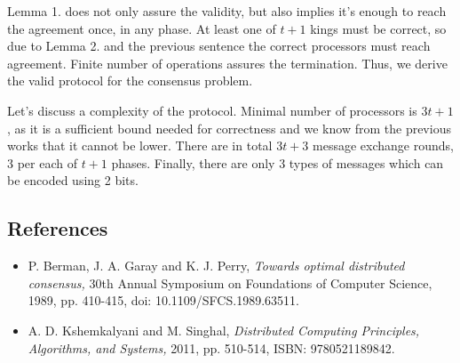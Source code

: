 \documentclass[11pt, a4paper]{report}
\begin{document}
Lemma 1. does not only assure the validity, but also implies it's enough to reach the agreement once, in any phase. At least one of $t+1$ kings must be correct, so due to Lemma 2. and the previous sentence the correct processors must reach agreement. Finite number of operations assures the termination. Thus, we derive the valid protocol for the consensus problem.

Let's discuss a complexity of the protocol. Minimal number of processors is $3t+1$, as it is a sufficient bound needed for correctness and we know from the previous works that it cannot be lower. There are in total $3t+3$ message exchange rounds, 3 per each of $t+1$ phases. Finally, there are only 3 types of messages which can be encoded using 2 bits.

\subsection*{References}
\begin{itemize}
    \item P. Berman, J. A. Garay and K. J. Perry, \emph{Towards optimal distributed consensus,} 30th Annual Symposium on Foundations of Computer Science, 1989, pp. 410-415, doi: 10.1109/SFCS.1989.63511.
    \item A. D. Kshemkalyani and M. Singhal, \emph{Distributed Computing Principles, Algorithms, and Systems,} 2011, pp. 510-514, ISBN: 9780521189842.
\end{itemize}
\end{document}
